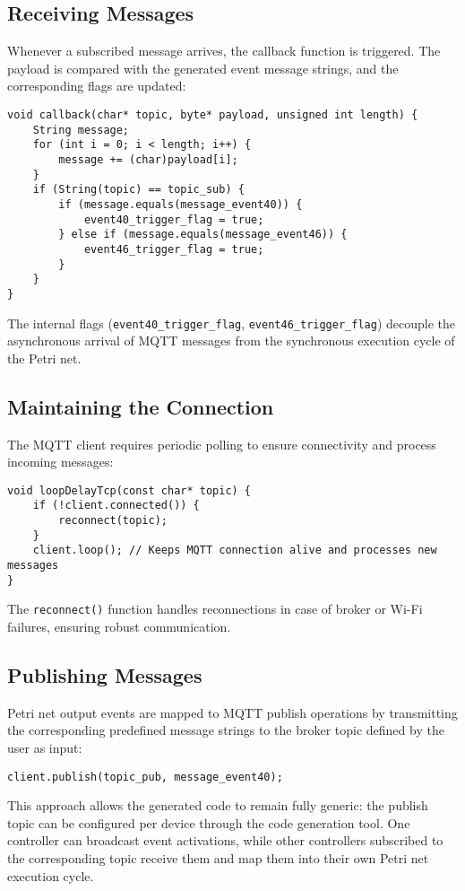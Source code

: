 \subsection{Receiving Messages}
Whenever a subscribed message arrives, the callback function is triggered. The payload is compared with the generated event message strings, and the corresponding flags are updated:
\begin{verbatim}
void callback(char* topic, byte* payload, unsigned int length) {
    String message;
    for (int i = 0; i < length; i++) {
        message += (char)payload[i];
    }
    if (String(topic) == topic_sub) {
        if (message.equals(message_event40)) {
            event40_trigger_flag = true;
        } else if (message.equals(message_event46)) {
            event46_trigger_flag = true;
        }
    }
}
\end{verbatim}
The internal flags (\texttt{event40\_trigger\_flag}, \texttt{event46\_trigger\_flag}) decouple the asynchronous arrival of MQTT messages from the synchronous execution cycle of the Petri net.

\subsection{Maintaining the Connection}
The MQTT client requires periodic polling to ensure connectivity and process incoming messages:
\begin{verbatim}
void loopDelayTcp(const char* topic) {
    if (!client.connected()) {
        reconnect(topic);
    }
    client.loop(); // Keeps MQTT connection alive and processes new messages
}
\end{verbatim}
The \texttt{reconnect()} function handles reconnections in case of broker or Wi-Fi failures, ensuring robust communication.

\subsection{Publishing Messages}
Petri net output events are mapped to MQTT publish operations by transmitting the corresponding predefined message strings to the broker topic defined by the user as input:
\begin{verbatim}
client.publish(topic_pub, message_event40);
\end{verbatim}
This approach allows the generated code to remain fully generic: the publish topic can be configured per device through the code generation tool. One controller can broadcast event activations, while other controllers subscribed to the corresponding topic receive them and map them into their own Petri net execution cycle.

